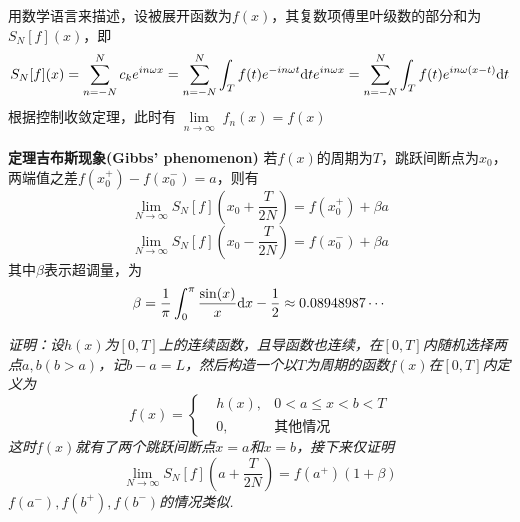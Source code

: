 \documentclass[UTF8]{ctexart}
\newcommand{\trm}[1]{{\rm #1}}
\newenvironment{theorem}[1]
    {\begin{tcolorbox}[enhanced, colback=LightYellow, breakable=true, frame hidden, borderline west={1.5mm}{-2mm}{DarkBlue}]
    {\bfseries {\color{DarkBlue} 定理}\quad #1} \newline}
    {\end{tcolorbox}}
\begin{document}
用数学语言来描述，设被展开函数为\(f(x)\)，其复数项傅里叶级数的部分和为\(S_N[f](x)\)，即
\[ S_N[f](x) = \sum_{n=-N}^{N} c_ke^{in\omega x} = \sum_{n=-N}^{N}\int_T f(t)e^{-in\omega t}\trm{d}t e^{in\omega x} = \sum_{n=-N}^{N}\int_Tf(t)e^{in\omega(x-t)}\trm{d}t \]
根据控制收敛定理，此时有\(\lim \limits_{\substack{n \to \infty}}f_n(x)=f(x)\)
\begin{theorem}{吉布斯现象(Gibbs' phenomenon)}
    若\(f(x)\)的周期为\(T\)，跳跃间断点为\(x_0\)，两端值之差\(f(x_0^+)-f(x_0^-)=a\)，则有
    \[\lim_{N \to \infty} S_N[f]\left(x_0+\frac{T}{2N}\right)=f(x_0^+)+\beta a\]
    \[\lim_{N \to \infty} S_N[f]\left(x_0-\frac{T}{2N}\right)=f(x_0^-)+\beta a\]
    其中\(\beta\)表示超调量，为
    \[\beta=\frac{1}{\pi}\int_{0}^{\pi}\frac{\sin(x)}{x}\trm{d}x-\frac{1}{2} \approx 0.08948987 \cdots\]
\end{theorem}
\textit{
    证明：设\(h(x)\)为\([0,T]\)上的连续函数，且导函数也连续，在\([0,T]\)内随机选择两点\(a,b(b>a)\)，记\(b-a=L\)，然后构造一个以\(T\)为周期的函数\(f(x)\)在\([0,T]\)内定义为
    \[f(x)=\left\{\begin{aligned} & h(x), & 0 < a \leq x < b < T \\ & 0, & \mbox{其他情况} \end{aligned}\right.\]
    这时\(f(x)\)就有了两个跳跃间断点\(x=a\)和\(x=b\)，接下来仅证明
    \[\lim_{N\to \infty} S_N[f](a+\frac{T}{2N})=f(a^+)(1+\beta)\]
    \(f(a^-),f(b^+),f(b^-)\)的情况类似.
}

\vspace{1cm}
\end{document}
